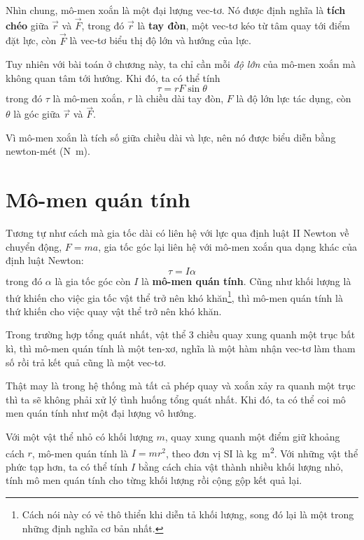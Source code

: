 \documentclass[12pt, openany]{book}
\theoremstyle{exercise}
\begin{document}
Nhìn chung, mô-men xoắn là một đại lượng vec-tơ. Nó được định nghĩa là {\bf tích chéo} giữa $\vec{r}$ và $\vec{F}$, trong đó $\vec{r}$ là {\bf tay đòn}, một vec-tơ kéo từ tâm quay tới điểm đặt lực, còn $\vec{F}$ là vec-tơ biểu thị độ lớn và hướng của lực.


Tuy nhiên với bài toán ở chương này, ta chỉ cần mỗi {\em độ lớn} của mô-men xoắn mà không quan tâm tới hướng. Khi đó, ta có thể tính 
%
\[ \tau = r F \sin \theta \]
%
trong đó $\tau$ là mô-men xoắn, $r$ là chiều dài tay đòn, $F$ là độ lớn lực tác dụng, còn $\theta$ là góc giữa $\vec{r}$ và $\vec{F}$.  


Vì mô-men xoắn là tích số giữa chiều dài và lực, nên nó được biểu diễn bằng newton-mét (\si{\newton\meter}).


\section{Mô-men quán tính}

Tương tự như cách mà gia tốc dài có liên hệ với lực qua định luật II Newton về chuyển động, $F=ma$, gia tốc góc lại liên hệ với mô-men xoắn qua dạng khác của định luật Newton:
%
\[ \tau = I \alpha \]
%
trong đó $\alpha$ là gia tốc góc còn $I$ là {\bf mô-men quán tính}.  Cũng như khối lượng là thứ khiến cho việc gia tốc vật thể trở nên khó khăn\footnote{Cách nói này có vẻ thô thiển khi diễn tả khối lượng, song đó lại là một trong những định nghĩa cơ bản nhất.}, thì mô-men quán tính là thứ khiến cho việc quay vật thể trở nên khó khăn.


Trong trường hợp tổng quát nhất, vật thể 3 chiều quay xung quanh một trục bất kì, thì mô-men quán tính là một ten-xơ, nghĩa là một hàm nhận vec-tơ làm tham số rồi trả kết quả cũng là một vec-tơ.


Thật may là trong hệ thống mà tất cả phép quay và xoắn xảy ra quanh một trục thì ta sẽ không phải xử lý tình huống tổng quát nhất. Khi đó, ta có thể coi mô men quán tính như một đại lượng vô hướng.


Với một vật thể nhỏ có khối lượng $m$, quay xung quanh một điểm giữ khoảng cách $r$, mô-men quán tính là $I = m r^2$, theo đơn vị SI là \si{\kilogram\meter\squared}.  Với những vật thể phức tạp hơn, ta có thể tính $I$ bằng cách chia vật thành nhiều khối lượng nhỏ, tính mô men quán tính cho từng khối lượng rồi cộng gộp kết quả lại.
\end{document}
